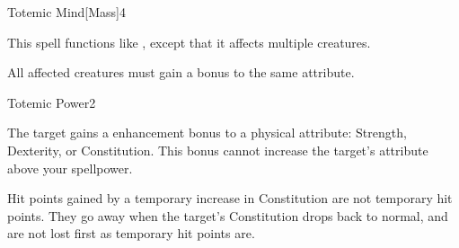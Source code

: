 \begin{spellsection}{Totemic Mind}[Mass]{4}
    \begin{spellheader}
    \end{spellheader}
    \begin{spellcontent}
        \begin{spelltargetinginfo}
        \end{spelltargetinginfo}
        \begin{spelleffects}
            \spellspecial This spell functions like , except that it affects multiple creatures.
            \spelldur \durshort
        \end{spelleffects}
    \end{spellcontent}
    \begin{spellfooter}
        \spellnotes All affected creatures must gain a bonus to the same attribute.
    \end{spellfooter}
\end{spellsection}

\begin{spellsection}{Totemic Power}{2}
    \begin{spellheader}
    \end{spellheader}
    \begin{spellcontent}
        \begin{spelltargetinginfo}
        \end{spelltargetinginfo}
        \begin{spelleffects}
            \spelleffect The target gains a  enhancement bonus to a physical attribute: Strength, Dexterity, or Constitution. This bonus cannot increase the target's attribute above your spellpower.
            \spelldur \durpersonallong
        \end{spelleffects}
    \end{spellcontent}
    \begin{spellfooter}
        \spellnotes Hit points gained by a temporary increase in Constitution are not temporary hit points. They go away when the target's Constitution drops back to normal, and are not lost first as temporary hit points are.
    \end{spellfooter}
\end{spellsection}

